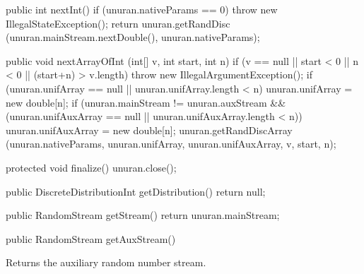 \begin{code}\begin{hide}

   public int nextInt() {
      if (unuran.nativeParams == 0)
         throw new IllegalStateException();
      return unuran.getRandDisc (unuran.mainStream.nextDouble(), unuran.nativeParams);
   }

   public void nextArrayOfInt (int[] v, int start, int n) {
      if (v == null || start < 0 || n < 0 || (start+n) > v.length)
         throw new IllegalArgumentException();
      if (unuran.unifArray == null || unuran.unifArray.length < n)
         unuran.unifArray = new double[n];
      if (unuran.mainStream != unuran.auxStream &&
         (unuran.unifAuxArray == null || unuran.unifAuxArray.length < n))
         unuran.unifAuxArray = new double[n];
      unuran.getRandDiscArray (unuran.nativeParams, unuran.unifArray,
                        unuran.unifAuxArray, v, start, n);
   }

   protected void finalize() {
      unuran.close();
   }

   public DiscreteDistributionInt getDistribution() { return null; }

   public RandomStream getStream() { return unuran.mainStream; }\end{hide}

   public RandomStream getAuxStream()\begin{hide} {
      return unuran.auxStream;
   }
}\end{hide}
\end{code}
\begin{tabb}   Returns the auxiliary random number stream.
\end{tabb}
